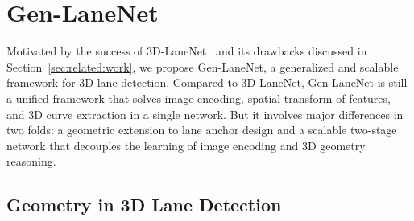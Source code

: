 \documentclass[10pt,twocolumn,letterpaper]{article}
\begin{document}
\begin{comment}

\begin{figure}[!h]
  \centering
  \texttt{[image: figs/3D\_LaneNet\_ReDraw.pdf]}
\caption{\textbf{3D-LaneNet:} An overview pipeline is shown. The whole network can be decomposed into four sub-networks: image-view pathway, road plane predication branch, top-view pathway and lane prediction head.} \label{fig:3DLaneNet:Arch}
\end{figure}

\end{comment}

















\section{Gen-LaneNet}
\label{sec:method}

Motivated by the success of 3D-LaneNet~\cite{Garnett:etal:ICCV2019} and its drawbacks discussed in Section~\ref{sec:related:work}, we propose Gen-LaneNet, a generalized and scalable framework for 3D lane detection. Compared to 3D-LaneNet, Gen-LaneNet is still a unified framework that solves image encoding, spatial transform of features, and 3D curve extraction in a single network. But it involves major differences in two folds: a geometric extension to lane anchor design and a scalable two-stage network that decouples the learning of image encoding and 3D geometry reasoning.


\subsection{Geometry in 3D Lane Detection}
\label{sec:sub:geometry}
\end{document}
